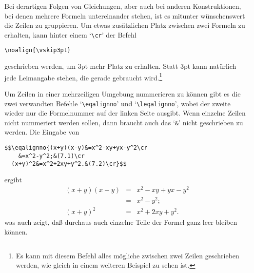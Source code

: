 Bei derartigen Folgen von Gleichungen, aber auch bei anderen
Konstruktionen, bei denen mehrere Formeln untereinander stehen, ist es
mitunter w\"unschenswert die Zeilen zu gruppieren. Um etwas zus\"atzlichen
Platz zwischen zwei Formeln zu erhalten, kann hinter einem `\verb|\cr|'
der Befehl
\begin{verbatim}
\noalign{\vskip3pt}
\end{verbatim}
geschrieben werden, um 3pt mehr Platz zu erhalten. Statt 3pt kann
nat\"urlich jede 
Leimangabe stehen, die gerade gebraucht
wird.\footnote{Es kann mit diesem Befehl alles m\"ogliche zwischen zwei
Zeilen geschrieben werden, wie gleich in einem weiteren Beispiel zu
sehen ist.}

Um Zeilen in einer mehrzeiligen Umgebung nummerieren zu k\"onnen gibt es
die zwei verwandten Befehle 
`\verb|\eqalignno|' und 
`\verb|\leqalignno|', wobei der
zweite wieder nur die Formelnummer auf der linken Seite ausgibt. Wenn
einzelne Zeilen nicht nummeriert werden sollen, dann braucht auch das
`\verb|&|' nicht geschrieben zu werden. Die Eingabe von
\begin{verbatim}
$$\eqalignno{(x+y)(x-y)&=x^2-xy+yx-y^2\cr
    &=x^2-y^2;&(7.1)\cr
  (x+y)^2&=x^2+2xy+y^2.&(7.2)\cr}$$
\end{verbatim}
ergibt
\begin{eqnarray}
(x+y)(x-y)&=&x^2-xy+yx-y^2\nonumber\\
    &=&x^2-y^2;\\
  (x+y)^2&=&x^2+2xy+y^2.\end{eqnarray}
was auch zeigt, da\ss{} durchaus auch einzelne Teile der Formel ganz
leer
bleiben k\"onnen.

